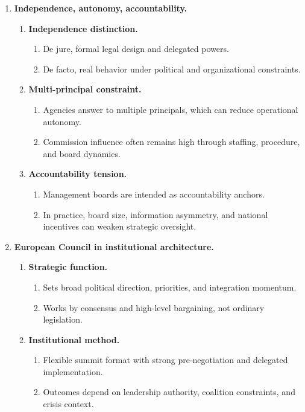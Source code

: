\documentclass[12pt]{article}
\begin{document}
\begin{enumerate}[label=\Roman*.]
    \item \textbf{Independence, autonomy, accountability.}
    \begin{enumerate}[label=\Alph*.]
        \item \textbf{Independence distinction.}
        \begin{enumerate}
            \item De jure, formal legal design and delegated powers.
            \item De facto, real behavior under political and organizational constraints.
        \end{enumerate}
        \item \textbf{Multi-principal constraint.}
        \begin{enumerate}
            \item Agencies answer to multiple principals, which can reduce operational autonomy.
            \item Commission influence often remains high through staffing, procedure, and board dynamics.
        \end{enumerate}
        \item \textbf{Accountability tension.}
        \begin{enumerate}
            \item Management boards are intended as accountability anchors.
            \item In practice, board size, information asymmetry, and national incentives can weaken strategic oversight.
        \end{enumerate}
    \end{enumerate}

    \item \textbf{European Council in institutional architecture.}
    \begin{enumerate}[label=\Alph*.]
        \item \textbf{Strategic function.}
        \begin{enumerate}
            \item Sets broad political direction, priorities, and integration momentum.
            \item Works by consensus and high-level bargaining, not ordinary legislation.
        \end{enumerate}
        \item \textbf{Institutional method.}
        \begin{enumerate}
            \item Flexible summit format with strong pre-negotiation and delegated implementation.
            \item Outcomes depend on leadership authority, coalition constraints, and crisis context.
        \end{enumerate}
    \end{enumerate}


\end{enumerate}
\end{document}
